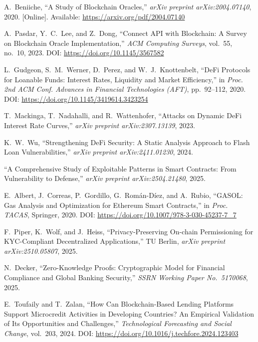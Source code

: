 \documentclass[12pt,a4paper]{report}
\begin{document}
{\begin{enumerate}[label={[\arabic*]}]
\item A.~Beniiche, ``A Study of Blockchain Oracles,'' \textit{arXiv preprint arXiv:2004.07140}, 2020. [Online]. Available: \url{https://arxiv.org/pdf/2004.07140}

\item A.~Pasdar, Y.~C.~Lee, and Z.~Dong, ``Connect API with Blockchain: A Survey on Blockchain Oracle Implementation,'' \textit{ACM Computing Surveys}, vol.~55, no.~10, 2023. DOI: \url{https://doi.org/10.1145/3567582}

\item L.~Gudgeon, S.~M.~Werner, D.~Perez, and W.~J.~Knottenbelt, ``DeFi Protocols for Loanable Funds: Interest Rates, Liquidity and Market Efficiency,'' in \textit{Proc. 2nd ACM Conf. Advances in Financial Technologies (AFT)}, pp.~92--112, 2020. DOI: \url{https://doi.org/10.1145/3419614.3423254}
\item T.~Mackinga, T.~Nadahalli, and R.~Wattenhofer, ``Attacks on Dynamic DeFi Interest Rate Curves,'' \textit{arXiv preprint arXiv:2307.13139}, 2023.

\item K.~W.~Wu, ``Strengthening DeFi Security: A Static Analysis Approach to Flash Loan Vulnerabilities,'' \textit{arXiv preprint arXiv:2411.01230}, 2024.

\item ``A Comprehensive Study of Exploitable Patterns in Smart Contracts: From Vulnerability to Defense,'' \textit{arXiv preprint arXiv:2504.21480}, 2025.

\item E.~Albert, J.~Correas, P.~Gordillo, G.~Rom\'{a}n-D\'{i}ez, and A.~Rubio, ``GASOL: Gas Analysis and Optimization for Ethereum Smart Contracts,'' in \textit{Proc. TACAS}, Springer, 2020. DOI: \url{https://doi.org/10.1007/978-3-030-45237-7_7}

\item F.~Piper, K.~Wolf, and J.~Heiss, ``Privacy-Preserving On-chain Permissioning for KYC-Compliant Decentralized Applications,'' TU Berlin, \textit{arXiv preprint arXiv:2510.05807}, 2025.

\item N.~Decker, ``Zero-Knowledge Proofs: Cryptographic Model for Financial Compliance and Global Banking Security,'' \textit{SSRN Working Paper No.~5170068}, 2025.

\item E.~Toufaily and T.~Zalan, ``How Can Blockchain-Based Lending Platforms Support Microcredit Activities in Developing Countries? An Empirical Validation of Its Opportunities and Challenges,'' \textit{Technological Forecasting and Social Change}, vol.~203, 2024. DOI: \url{https://doi.org/10.1016/j.techfore.2024.123403}


\end{enumerate}}
\end{document}
